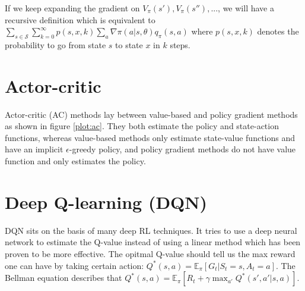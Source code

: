 \documentclass{article}
\begin{document}
\begin{multicols*}{2}
		If we keep expanding the gradient on $ V_\pi(s'), V_\pi(s''), ... $, we will have  
		a recursive definition which is equivalent to $ \sum_{s \in \mathcal{S}} \sum_{k=0}^\infty p(s, x, k)  \sum_ a \nabla \pi(a | s, \theta) q_\pi(s, a) $ where 
		$ p(s, x, k) $ denotes the probability to go from state $ s $ to state $ x $ in $ k $ steps. 
		
		\section*{Actor-critic}
		\begin{center}
		\label{plot:ac}
		\end{center}
		
		 Actor-critic  (AC) methods lay between value-based and policy gradient methods as shown in figure \ref{plot:ac}. They both estimate the policy and state-action functions, whereas value-based methods only estimate state-value functions and have an implicit $\epsilon$-greedy policy, and policy gradient methods do not have value function and only estimates the policy.
		
		\section*{Deep Q-learning (DQN)}
					 DQN sits on the basis of many deep RL techniques. It tries to use a deep neural network to estimate the Q-value instead of using a linear method which has been proven to be more effective. The opitmal Q-value should tell us the max reward one can have by taking certain action: $ Q^*(s, a) = \mathbb{E}_{\pi} [G_t | S_t=s, A_t=a ] $. The Bellman equation describes that $ Q^*(s, a) = \mathbb{E}_{\pi} [R_t + \gamma \max_{a'} Q^*(s', a' | s, a)] $.  \\
		

\end{multicols*}
\end{document}
